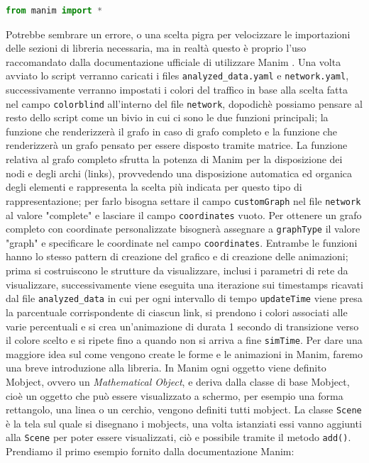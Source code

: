 \documentclass[binding=0.6cm]{sapthesis}
\begin{document}
{\scriptsize
\begin{lstlisting}[language=Python]
    from manim import *
\end{lstlisting}
}

Potrebbe sembrare un errore, o una scelta pigra per velocizzare le importazioni delle sezioni di libreria necessaria, ma in realtà questo è proprio
l'uso raccomandato dalla documentazione ufficiale di utilizzare Manim \cite{ManimDocs}.
Una volta avviato lo script verranno caricati i files \texttt{analyzed\_data.yaml} e \texttt{network.yaml}, successivamente verranno impostati i colori del traffico in base
alla scelta fatta nel campo \texttt{colorblind} all'interno del file \texttt{network}, dopodichè possiamo pensare al resto dello script come un bivio in cui ci sono le due funzioni principali;
la funzione che renderizzerà il grafo in caso di grafo completo e la funzione che renderizzerà un grafo pensato per essere disposto
tramite matrice. La funzione relativa al grafo completo sfrutta la potenza di Manim per la disposizione dei nodi e degli archi (links), provvedendo
una disposizione automatica ed organica degli elementi e rappresenta la scelta più indicata per questo tipo di rappresentazione; per
farlo bisogna settare il campo \texttt{customGraph} nel file \texttt{network} al valore "complete" e lasciare il campo \texttt{coordinates} vuoto. Per ottenere un grafo
completo con coordinate personalizzate bisognerà assegnare a \texttt{graphType} il valore "graph" e specificare le coordinate nel campo \texttt{coordinates}. Entrambe le funzioni hanno lo stesso pattern di creazione del grafico e di creazione delle animazioni;
prima si costruiscono le strutture da visualizzare, inclusi i parametri di rete da visualizzare, successivamente viene eseguita una iterazione sui timestamps ricavati
dal file \texttt{analyzed\_data} in cui per ogni intervallo di tempo \texttt{updateTime} viene presa la parcentuale corrispondente di ciascun link, 
si prendono i colori associati alle varie percentuali e si crea un'animazione di durata 1 secondo di transizione verso il colore scelto e si ripete 
fino a quando non si arriva a fine \texttt{simTime}.
Per dare una maggiore idea sul come vengono create le forme e le animazioni in Manim, faremo una breve introduzione alla libreria.
In Manim ogni oggetto viene definito Mobject, ovvero un \textit{Mathematical Object}, e deriva dalla classe di base Mobject, cioè un oggetto che può essere visualizzato a schermo,
per esempio una forma rettangolo, una linea o un cerchio, vengono definiti tutti mobject.
La classe \texttt{Scene} è la tela sul quale si disegnano i mobjects, una volta istanziati essi vanno aggiunti alla \texttt{Scene} per poter essere visualizzati,
ciò e possibile tramite il metodo \lstinline|add()|. Prendiamo il primo esempio fornito dalla documentazione Manim:
\end{document}
